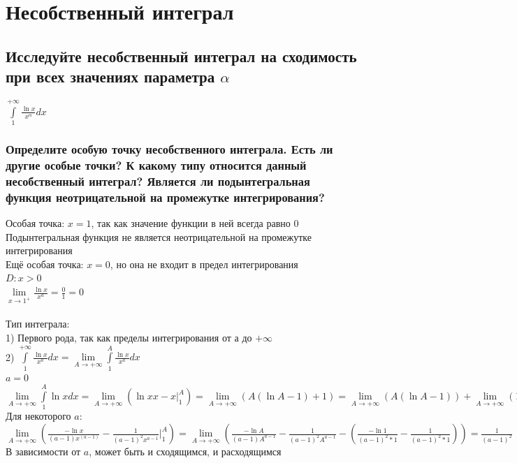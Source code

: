 \documentclass{article}
\begin{document}
\section{Несобственный интеграл}
\normalsize
\subsection{Исследуйте несобственный интеграл на сходимость при всех значениях параметра $ \alpha $}
\large $ \int\limits^{+\infty}_{1} \frac{\ln{x}}{x^{\alpha}}dx $\\
\normalsize
\subsubsection{Определите особую точку несобственного интеграла. Есть ли другие особые точки? К какому типу относится данный несобственный интеграл? Является ли подынтегральная функция неотрицательной на промежутке интегрирования?}
Особая точка: $ x = 1 $, так как значение функции в ней всегда равно $ 0 $\\
Подынтегральная функция не является неотрицательной на промежутке интегрирования\\
Ещё особая точка: $ x = 0 $, но она не входит в предел интегрирования\\
$ D: x > 0 $\\
$ \lim\limits_{x\to 1^{+}} \frac{\ln{x}}{x^a} = \frac{0}{1} = 0 $\\\\
Тип интеграла:\\
1) Первого рода, так как пределы интегрирования от $ а $ до $ +\infty $\\
2) $ \int\limits^{+\infty}_{1} \frac{\ln{x}}{x^a}dx = \lim\limits_{A\to +\infty} \int\limits^A_1 \frac{\ln{x}}{x^a}dx $\\
$ a = 0 $\\
$ \lim\limits_{A\to +\infty} \int\limits^A_1 \ln{x}dx = \lim\limits_{A\to +\infty}(\ln{x}x - x |^A_1) = \lim\limits_{A \to +\infty} (A (\ln{A-1}) + 1) = \lim\limits_{A \to +\infty} (A (\ln{A - 1})) + \lim\limits_{A \to +\infty} (1) = \lim\limits_{A \to +\infty} (A) * \lim\limits_{A \to +\infty} (\ln{A - 1}) + 1 = +\infty $\\
Для некоторого $ a $:\\
$ \lim\limits_{A\to +\infty} (\frac{-\ln{x}}{(a-1)x^{(a-1)}} - \frac{1}{(a-1)^2 x^{a-1}} |^A_1) = \lim\limits_{A\to +\infty} (\frac{-\ln{A}}{(a-1)A^{a-1}} - \frac{1}{(a-1)^2 A^{a-1}} - (\frac{-\ln{1}}{(a-1)^2 * 1} - \frac{1}{(a-1)^2 * 1})) = \frac{1}{(a-1)^2} $\\
В зависимости от $ a $, может быть и сходящимся, и расходящимся
\end{document}
